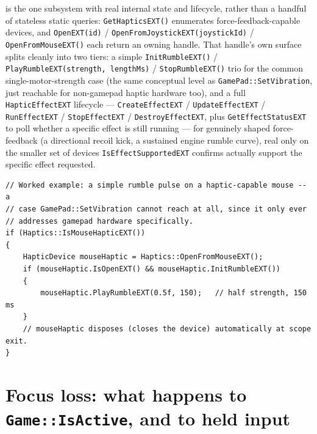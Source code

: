  is the one subsystem with real internal state and lifecycle, rather than a
handful of stateless static queries: \texttt{GetHapticsEXT()} enumerates force-feedback-capable
devices, and \texttt{OpenEXT(id)} / \texttt{OpenFromJoystickEXT(joystickId)} /
\texttt{OpenFromMouseEXT()} each return an owning  handle. That handle's
own surface splits cleanly into two tiers: a simple \texttt{InitRumbleEXT()} /
\texttt{PlayRumbleEXT(strength, lengthMs)} / \texttt{StopRumbleEXT()} trio for the common
single-motor-strength case (the same conceptual level as \texttt{GamePad::SetVibration}, just
reachable for non-gamepad haptic hardware too), and a full \texttt{HapticEffectEXT}
lifecycle --- \texttt{CreateEffectEXT} / \texttt{UpdateEffectEXT} / \texttt{RunEffectEXT} /
\texttt{StopEffectEXT} / \texttt{DestroyEffectEXT}, plus \texttt{GetEffectStatusEXT} to poll
whether a specific effect is still running --- for genuinely shaped force-feedback (a
directional recoil kick, a sustained engine rumble curve), real only on the smaller set of
devices \texttt{IsEffectSupportedEXT} confirms actually support the specific effect requested.

\begin{lstlisting}
// Worked example: a simple rumble pulse on a haptic-capable mouse -- a
// case GamePad::SetVibration cannot reach at all, since it only ever
// addresses gamepad hardware specifically.
if (Haptics::IsMouseHapticEXT())
{
    HapticDevice mouseHaptic = Haptics::OpenFromMouseEXT();
    if (mouseHaptic.IsOpenEXT() && mouseHaptic.InitRumbleEXT())
    {
        mouseHaptic.PlayRumbleEXT(0.5f, 150);   // half strength, 150 ms
    }
    // mouseHaptic disposes (closes the device) automatically at scope exit.
}
\end{lstlisting}

\section{Focus loss: what happens to \texttt{Game::IsActive}, and to held input}

